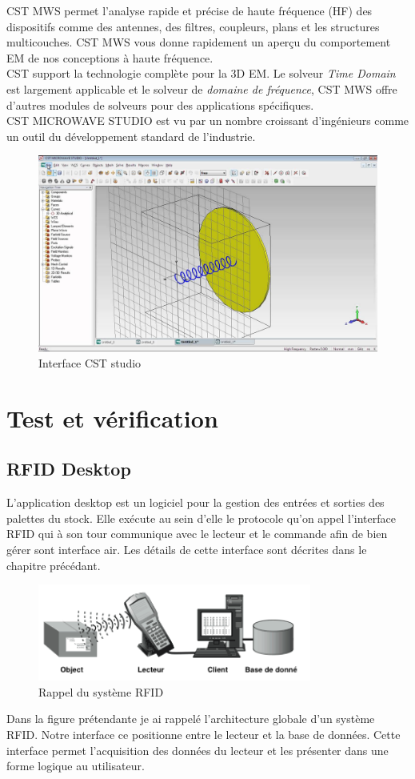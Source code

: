 \documentclass[11pt, a4paper, twoside]{book}
\begin{document}
CST MWS permet l'analyse rapide et précise de haute fréquence (HF) des dispositifs comme des antennes, des filtres, coupleurs, plans et les structures multicouches.  CST MWS vous donne rapidement un aperçu du comportement EM de nos conceptions à haute fréquence.\\

CST support la technologie complète pour la 3D EM. Le solveur \emph{Time Domain} est largement applicable et le solveur de \emph{domaine de fréquence}, CST MWS offre d'autres modules de solveurs pour des applications spécifiques. \\

CST MICROWAVE STUDIO est vu par un nombre croissant d'ingénieurs comme un outil du développement standard de l'industrie.
\begin{figure}[H]
\centering
\includegraphics[width=\textwidth]{cst}
\caption{Interface CST studio}
\end{figure}
\section{Test	 et vérification	}
\subsection{RFID Desktop}
L'application desktop  est un logiciel pour la gestion des entrées et sorties des palettes du stock. Elle exécute au sein d'elle le protocole qu'on appel l'interface RFID qui à son tour communique avec le lecteur et le commande afin de bien gérer sont interface air. Les détails de cette interface sont décrites dans le chapitre précédant. 
\begin{figure}[H]
\centering
\includegraphics[width=9cm]{systemx}
\caption{Rappel du système RFID}
\end{figure}
Dans la figure prétendante je ai rappelé l'architecture globale d'un système RFID. Notre interface ce positionne entre le lecteur et la base de données. Cette interface permet l'acquisition des données du lecteur et les présenter dans une forme logique au utilisateur.
\end{document}
